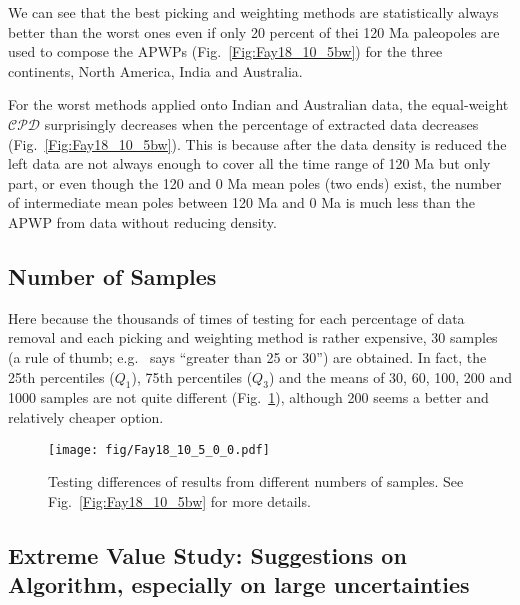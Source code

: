 We can see that the best picking and weighting methods are statistically always
better than the worst ones even if only 20 percent of thei 120 Ma
paleopoles are used to compose the APWPs (Fig.~\ref{Fig:Fay18_10_5bw}) for the
three continents, North America, India and Australia.

For the worst methods applied onto Indian and Australian data, the equal-weight
$\mathcal{CPD}$ surprisingly decreases when the percentage of extracted data
decreases (Fig.~\ref{Fig:Fay18_10_5bw}). This is because after the data density
is reduced the left data are not always enough to cover all the time range of
120 Ma but only part, or even though the 120 and 0 Ma mean poles
(two ends) exist, the number of intermediate mean poles between 120 Ma and 0 Ma
is much less than the APWP from data without reducing density.

\subsection{Number of Samples}
Here because the thousands of times of testing for each percentage of data
removal and each picking and weighting method is rather expensive, 30 samples
(a rule of thumb; e.g.~\cite{H19} says ``greater than 25 or 30'') are obtained.
In fact, the 25th percentiles ($Q_1$), 75th percentiles ($Q_3$) and the means of
30, 60, 100, 200 and 1000 samples are not quite different
(Fig.~\ref{Fig:Fay18_10_5_0_0}), although 200 seems a better and relatively
cheaper option.

\begin{figure}
    \centering
        \texttt{[image: fig/Fay18\_10\_5\_0\_0.pdf]}
    \captionsetup{width=.95\textwidth}
    \caption{Testing differences of results from different numbers of samples.
	See Fig.~\ref{Fig:Fay18_10_5bw} for more details.}\label{Fig:Fay18_10_5_0_0}
\end{figure}


\subsection{Extreme Value Study: Suggestions on Algorithm, especially on large
uncertainties}

